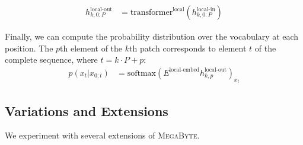\documentclass{article}
\newcommand{\fastslow}[0]{\textsc{MegaByte}\xspace}
\newcommand{\megabyte}[0]{\fastslow}
\newcommand{\h}[1]{h^\text{#1}}%
\newcommand{\inR}[1]{\in\mathbb{R}^{#1}}
\newcommand{\transformer}[2]{\text{transformer}^{\text{#1}}(#2)}
\theoremstyle{plain}
\theoremstyle{definition}
\theoremstyle{remark}
\begin{document}
\begin{align}
\h{local-out}_{k,0:P} &= \transformer{local}{\h{local-in}_{k,0:P}} %
\end{align}

Finally, we can compute the probability distribution over the vocabulary at each position. The $p$th element of the $k$th patch corresponds to element $t$ of the complete sequence, where $t=k\cdot P+p$:
\begin{align}
p(x_{t}|x_{0:t}) &= \text{softmax}{(E^\text{local-embed}\h{local-out}_{k,p})}_{x_t} 
\end{align}








\subsection{Variations and Extensions}
We experiment with several extensions of \megabyte.
\end{document}
